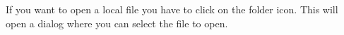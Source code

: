 If you want to open a local file you have to click on the folder icon.
This will open a dialog where you can select the file to open.





